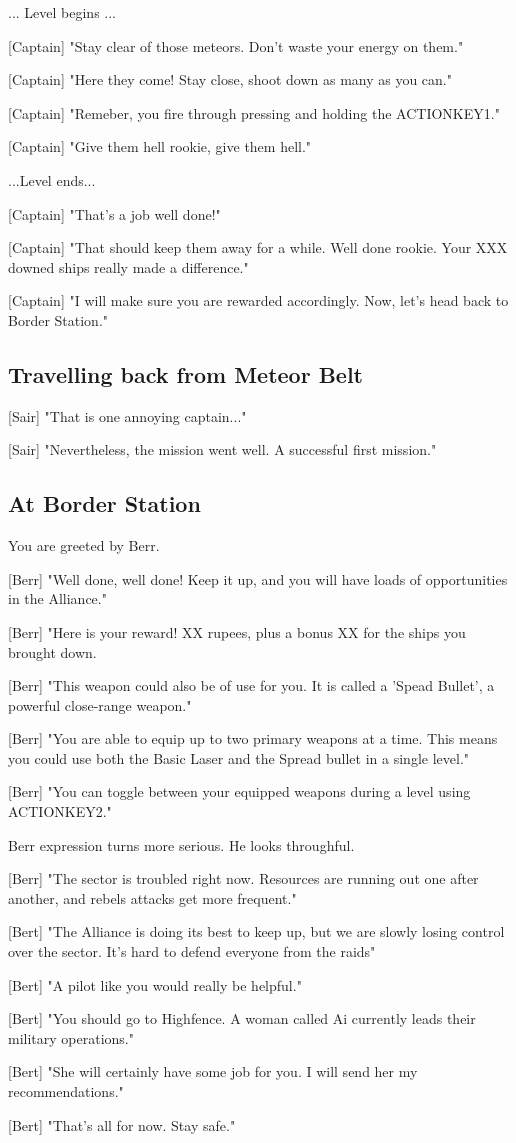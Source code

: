 \documentclass[a4paper,12pt]{article}
\begin{document}
... Level begins ...

[Captain] "Stay clear of those meteors. Don't waste your energy on them."

[Captain] "Here they come! Stay close, shoot down as many as you can." 

[Captain] "Remeber, you fire through pressing and holding the ACTIONKEY1." 

[Captain] "Give them hell rookie, give them hell."

...Level ends...

[Captain] "That's a job well done!" 

[Captain] "That should keep them away for a while. Well done rookie. Your XXX downed ships really made a difference."

[Captain] "I will make sure you are rewarded accordingly. Now, let's head back to Border Station."

\subsection{Travelling back from Meteor Belt}

[Sair] "That is one annoying captain..." 

[Sair] "Nevertheless, the mission went well. A successful first mission."

\subsection{At Border Station}

You are greeted by Berr. 

[Berr] "Well done, well done! Keep it up, and you will have loads of opportunities
in the Alliance." 

[Berr] "Here is your reward! XX rupees, plus a bonus XX for the ships you brought down. 

[Berr] "This weapon could also be of use for you. It is called a 'Spead Bullet', a powerful close-range weapon."

[Berr] "You are able to equip up to two primary weapons at a time. This means you could use both the Basic Laser and 
the Spread bullet in a single level."

[Berr] "You can toggle between your equipped weapons during a level using ACTIONKEY2."

Berr expression turns more serious. He looks throughful.

[Berr] "The sector is troubled right now. Resources are running out one after another,
and rebels attacks get more frequent."

[Bert] "The Alliance is doing its best to keep up, but we are slowly losing control over the sector. It's hard to defend
everyone from the raids"

[Bert] "A pilot like you would really be helpful."

[Bert] "You should go to Highfence. A woman called Ai currently leads their military operations."

[Bert] "She will certainly have some job for you. I will send her my recommendations."

[Bert] "That's all for now. Stay safe."
\end{document}
